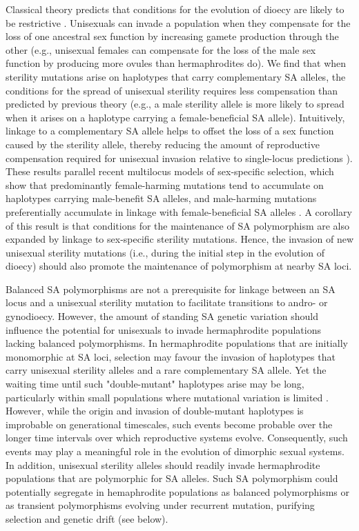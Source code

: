 \documentclass{article}
\begin{document}
Classical theory predicts that conditions for the evolution of dioecy are likely to be restrictive \citep{Lloyd1975,Lloyd1976,Charlesworth1978a,KaferPannell2017}. Unisexuals can invade a population when they compensate for the loss of one ancestral sex function by increasing gamete production through the other (e.g., unisexual females can compensate for the loss of the male sex function by producing more ovules than hermaphrodites do). We find that when sterility mutations arise on haplotypes that carry complementary SA alleles, the conditions for the spread of unisexual sterility requires less compensation than predicted by previous theory (e.g., a male sterility allele is more likely to spread when it arises on a haplotype carrying a female-beneficial SA allele). Intuitively, linkage to a complementary SA allele helps to offset the loss of a sex function caused by the sterility allele, thereby reducing the amount of reproductive compensation required for unisexual invasion relative to single-locus predictions \citealt{Charlesworth1978a}). These results parallel recent multilocus models of sex-specific selection, which show that predominantly female-harming mutations tend to accumulate on haplotypes carrying male-benefit SA alleles, and male-harming mutations preferentially accumulate in linkage with female-beneficial SA alleles \citep{ConnallonJordan2016, Patten2010, UbedaPatten2010, BlackburnOtto2010}. A corollary of this result is that conditions for the maintenance of SA polymorphism are also expanded by linkage to sex-specific sterility mutations. Hence, the invasion of new unisexual sterility mutations (i.e., during the initial step in the evolution of dioecy) should also promote the maintenance of polymorphism at nearby SA loci. 

Balanced SA polymorphisms are not a prerequisite for linkage between an SA locus and a unisexual sterility mutation to facilitate transitions to andro- or gynodioecy. However, the amount of standing SA genetic variation should influence the potential for unisexuals to invade hermaphrodite populations lacking balanced polymorphisms. In hermaphrodite populations that are initially monomorphic at SA loci, selection may favour the invasion of haplotypes that carry unisexual sterility alleles and a rare complementary SA allele. Yet the waiting time until such "double-mutant" haplotypes arise may be long, particularly within small populations where mutational variation is limited \citep{WeinreichChao2005,ConnallonClark2010}. However, while the origin and invasion of double-mutant haplotypes is improbable on generational timescales, such events become probable over the longer time intervals over which reproductive systems evolve. Consequently, such events may play a meaningful role in the evolution of dimorphic sexual systems. In addition, unisexual sterility alleles should readily invade hermaphrodite populations that are polymorphic for SA alleles. Such SA polymorphism could potentially segregate in hemaphrodite populations as balanced polymorphisms or as transient polymorphisms evolving under recurrent mutation, purifying selection and genetic drift (see below).
\end{document}
